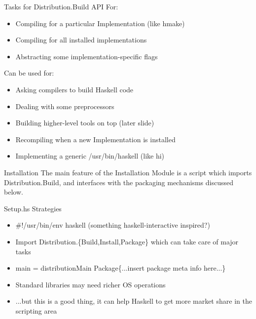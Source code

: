 \documentclass[pdf,rico,slideColor,colorBG]{prosper}
\begin{document}
\begin{slide}{Tasks for Distribution.Build}
API For:
\begin{itemize}
  \item Compiling for a particular Implementation (like hmake)
  \item Compiling for all installed implementations
  \item Abstracting some implementation-specific flags
\end{itemize}
Can be used for:
\begin{itemize}
  \item Asking compilers to build Haskell code
  \item Dealing with some preprocessors
  \item Building higher-level tools on top (later slide)
  \item Recompiling when a new Implementation is installed
  \item Implementing a generic /usr/bin/haskell (like hi)
\end{itemize}
\end{slide}


\begin{slide}{Installation}
The main feature of the Installation Module is a script which imports
Distribution.Build, and interfaces with the packaging mechanisms
discussed below.
\end{slide}

\begin{slide}{Setup.hs Strategies}
\begin{itemize}
  \item \#!/usr/bin/env haskell (something haskell-interactive inspired?)
  \item Import Distribution.\{Build,Install,Package\} which can take care of major tasks
  \item main = distributionMain Package\{...insert package meta info here...\}
  \item Standard libraries may need richer OS operations
  \item ...but this is a good thing, it can help Haskell to get more market share in the scripting area
\end{itemize}
\end{slide}
\end{document}
